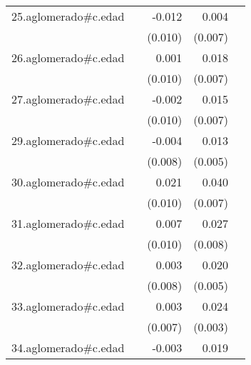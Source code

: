 {\begin{longtable}{l*{4}{D{.}{.}{-1}}}
\addlinespace
25.aglomerado#c.edad&                     &      -0.012         &       0.004         &                     \\
            &                     &     (0.010)         &     (0.007)         &                     \\
\addlinespace
26.aglomerado#c.edad&                     &       0.001         &       0.018\sym{*}  &                     \\
            &                     &     (0.010)         &     (0.007)         &                     \\
\addlinespace
27.aglomerado#c.edad&                     &      -0.002         &       0.015\sym{*}  &                     \\
            &                     &     (0.010)         &     (0.007)         &                     \\
\addlinespace
29.aglomerado#c.edad&                     &      -0.004         &       0.013\sym{**} &                     \\
            &                     &     (0.008)         &     (0.005)         &                     \\
\addlinespace
30.aglomerado#c.edad&                     &       0.021\sym{*}  &       0.040\sym{***}&                     \\
            &                     &     (0.010)         &     (0.007)         &                     \\
\addlinespace
31.aglomerado#c.edad&                     &       0.007         &       0.027\sym{***}&                     \\
            &                     &     (0.010)         &     (0.008)         &                     \\
\addlinespace
32.aglomerado#c.edad&                     &       0.003         &       0.020\sym{***}&                     \\
            &                     &     (0.008)         &     (0.005)         &                     \\
\addlinespace
33.aglomerado#c.edad&                     &       0.003         &       0.024\sym{***}&                     \\
            &                     &     (0.007)         &     (0.003)         &                     \\
\addlinespace
34.aglomerado#c.edad&                     &      -0.003         &       0.019\sym{**} &                     \\

\end{longtable}}
